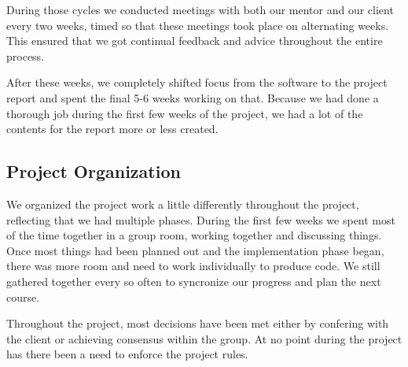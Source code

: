 During those cycles we conducted meetings with both our mentor and our client
every two weeks, timed so that these meetings took place on alternating weeks.
This ensured that we got continual feedback and advice throughout the entire
process. 

After these weeks, we completely shifted focus from the software to the project
report and spent the final 5-6 weeks working on that. Because we had done a
thorough job during the first few weeks of the project, we had a lot of the
contents for the report more or less created.

\subsection{Project Organization}
We organized the project work a little differently throughout the project,
reflecting that we had multiple phases. During the first few weeks we spent most
of the time together in a group room, working together and discussing things.
Once most things had been planned out and the implementation phase began, there
was more room and need to work individually to produce code. We still gathered 
together every so often to syncronize our progress and plan the next course.

Throughout the project, most decisions have been met either by confering with
the client or achieving consensus within the group. At no point during the
project has there been a need to enforce the project rules. 
